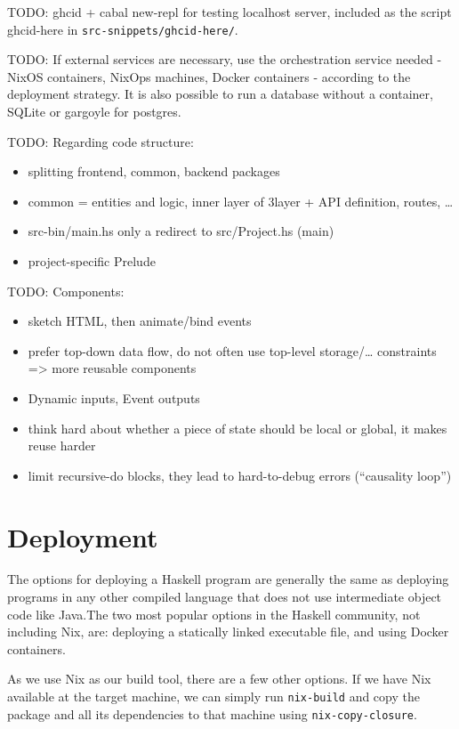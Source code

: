 \documentclass[english,odsaz]{fitthesis}
\begin{document}
TODO: ghcid + cabal new-repl for testing localhost server, included as the
script ghcid-here in \texttt{src-snippets/ghcid-here/}.

TODO: If external services are necessary, use the orchestration service needed -
NixOS containers, NixOps machines, Docker containers - according to the
deployment strategy. It is also possible to run a database without a container,
SQLite or gargoyle for postgres.

TODO: Regarding code structure:
\begin{itemize}
\item splitting frontend, common, backend packages
\item common = entities and logic, inner layer of 3layer + API definition, routes, \ldots{}
\item src-bin/main.hs only a redirect to src/Project.hs (main)
\item project-specific Prelude
\end{itemize}

TODO: Components:
\begin{itemize}
\item sketch HTML, then animate/bind events
\item prefer top-down data flow, do not often use top-level storage/\ldots{} constraints
=> more reusable components
\item Dynamic inputs, Event outputs
\item think hard about whether a piece of state should be local or global, it makes
reuse harder
\item limit recursive-do blocks, they lead to hard-to-debug errors (``causality loop'')
\end{itemize}

\section{Deployment}
\label{sec:orgaaadbf2}
The options for deploying a Haskell program are generally the same as deploying
programs in any other compiled language that does not use intermediate object
code like Java.The two most popular options in the Haskell community, not
including Nix, are: deploying a statically linked executable file, and using
Docker containers.

As we use Nix as our build tool, there are a few other options. If we have Nix
available at the target machine, we can simply run \texttt{nix-build} and copy the
package and all its dependencies to that machine using \texttt{nix-copy-closure}.
\end{document}
